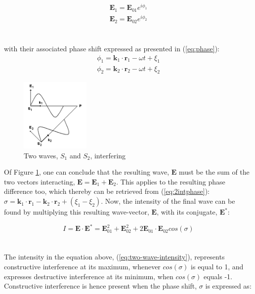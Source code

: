 \begin{equation}
    \begin{split}
    \textbf{E}_1 = \textbf{E}_{01} e^{i \phi_1}\\ %
    \textbf{E}_2 = \textbf{E}_{02} e^{i \phi_2}
    \end{split}
    \label{eq:2int}
\end{equation}
\\\\
with their associated phase shift expressed as presented in (\ref{eq:phase}):
\begin{equation}
    \begin{split}
    \phi_1 = \textbf{k}_1\cdot \textbf{r}_1 - \omega t + \xi_1\\
    \phi_2 = \textbf{k}_2\cdot \textbf{r}_2 - \omega t + \xi_2
    \end{split}
    \label{eq:2intphase}
\end{equation}
\begin{figure}[h]
  \centering
    \includegraphics[width=0.3\textwidth]{Images/theory/interference.png}
    \caption{Two waves, $S_1$ and $S_2$, interfering}
    \label{fig:interference}
\end{figure}
Of Figure \ref{fig:interference}, one can conclude that the resulting wave, $\textbf{E}$ must be the sum of the two vectors interacting, $\textbf{E} = \textbf{E}_1 + \textbf{E}_2$. This applies to the resulting phase difference too, which thereby can be retrieved from (\ref{eq:2intphase}): $\sigma = \textbf{k}_1\cdot \textbf{r}_1 - \textbf{k}_2\cdot \textbf{r}_2 + (\xi_1 - \xi_2)$. Now, the intensity of the final wave can be found by multiplying this resulting wave-vector, $\textbf{E}$, with its conjugate, $\textbf{E}^*$: 

\begin{equation}
    I = \textbf{E} \cdot \textbf{E}^* = \textbf{E}_{01}^2 + \textbf{E}_{02}^2 + 2\textbf{E}_{01}\cdot \textbf{E}_{02} cos(\sigma)
    \label{eq:two-wave-intensity}
\end{equation}
\\\\
The intensity in the equation above, (\ref{eq:two-wave-intensity}), represents constructive interference at its maximum, whenever $cos(\sigma)$ is equal to 1, and expresses destructive interference at its minimum, when $cos(\sigma)$ equals -1. Constructive interference is hence present when the phase shift, $\sigma$ is expressed as:

